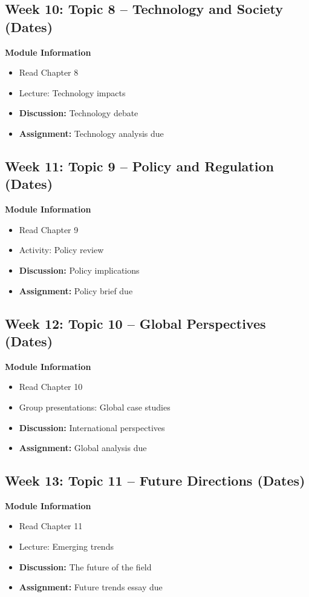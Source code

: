 \documentclass[12pt]{article}
\begin{document}
\subsection*{Week 10: Topic 8 -- Technology and Society (Dates)}
\textbf{Module Information}
\begin{itemize}
\item Read Chapter 8
\item Lecture: Technology impacts
\item \textbf{Discussion:} Technology debate
\item \textbf{Assignment:} Technology analysis due
\end{itemize}

\subsection*{Week 11: Topic 9 -- Policy and Regulation (Dates)}
\textbf{Module Information}
\begin{itemize}
\item Read Chapter 9
\item Activity: Policy review
\item \textbf{Discussion:} Policy implications
\item \textbf{Assignment:} Policy brief due
\end{itemize}

\subsection*{Week 12: Topic 10 -- Global Perspectives (Dates)}
\textbf{Module Information}
\begin{itemize}
\item Read Chapter 10
\item Group presentations: Global case studies
\item \textbf{Discussion:} International perspectives
\item \textbf{Assignment:} Global analysis due
\end{itemize}

\subsection*{Week 13: Topic 11 -- Future Directions (Dates)}
\textbf{Module Information}
\begin{itemize}
\item Read Chapter 11
\item Lecture: Emerging trends
\item \textbf{Discussion:} The future of the field
\item \textbf{Assignment:} Future trends essay due
\end{itemize}
\end{document}
